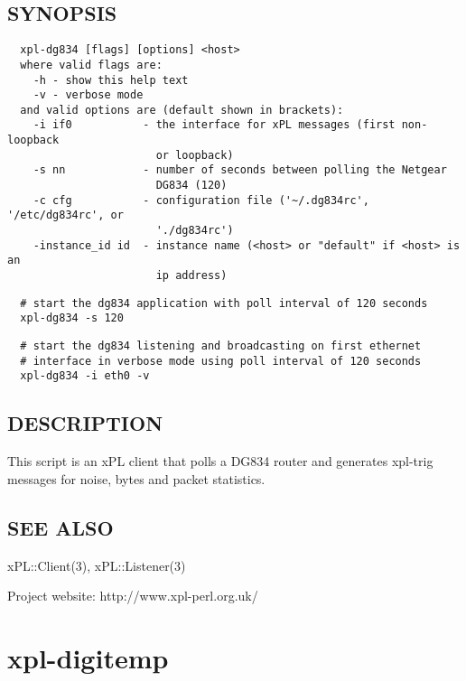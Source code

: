 \documentclass[12pt,a4paper]{article}
\begin{document}
\subsection*{SYNOPSIS\label{xpl-dg834_SYNOPSIS}}
\begin{verbatim}
  xpl-dg834 [flags] [options] <host>
  where valid flags are:
    -h - show this help text
    -v - verbose mode
  and valid options are (default shown in brackets):
    -i if0           - the interface for xPL messages (first non-loopback
                       or loopback)
    -s nn            - number of seconds between polling the Netgear
                       DG834 (120)
    -c cfg           - configuration file ('~/.dg834rc', '/etc/dg834rc', or
                       './dg834rc')
    -instance_id id  - instance name (<host> or "default" if <host> is an
                       ip address)
\end{verbatim}
\begin{verbatim}
  # start the dg834 application with poll interval of 120 seconds
  xpl-dg834 -s 120
\end{verbatim}
\begin{verbatim}
  # start the dg834 listening and broadcasting on first ethernet
  # interface in verbose mode using poll interval of 120 seconds
  xpl-dg834 -i eth0 -v
\end{verbatim}
\subsection*{DESCRIPTION\label{xpl-dg834_DESCRIPTION}}


This script is an xPL client that polls a DG834 router and generates
xpl-trig messages for noise, bytes and packet statistics.

\subsection*{SEE ALSO\label{xpl-dg834_SEE_ALSO}}


xPL::Client(3), xPL::Listener(3)



Project website: http://www.xpl-perl.org.uk/

\newpage
\section{xpl-digitemp\label{xpl-digitemp}}
\end{document}
